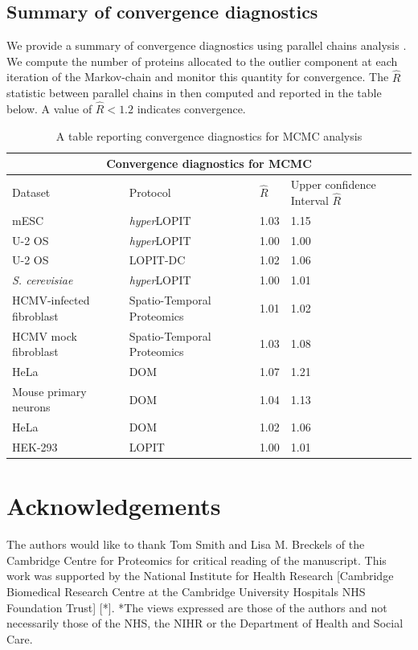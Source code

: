 \documentclass[12pt,english]{article}
\begin{document}
\subsection{Summary of convergence diagnostics}
We provide a summary of convergence diagnostics using parallel chains analysis \citep{Gelman:1992}. We compute the number of proteins allocated to the outlier component at each iteration of the Markov-chain and monitor this quantity for convergence. The $\hat{R}$ statistic between parallel chains in then computed and reported in the table below. A value of $\hat{R} < 1.2$ indicates convergence.
\begin{table}[h]
	\centering
	\footnotesize
	\begin{tabular}{ |p{5cm}|p{3cm}|p{2cm}|p{4cm}|  }
		\hline
		\multicolumn{4}{|c|}{Convergence diagnostics for MCMC} \\
		\hline
		\vfill\hfil Dataset & \vfill\hfil Protocol & \vfill\hfil$\hat{R}$ & \vfill\hfil Upper confidence Interval \vfill\hfil $\hat{R}$   \\
		\hline
		\hline
		mESC  & \textit{hyper}LOPIT&\vfill\hfil 1.03 & \vfill\hfil 1.15 \\
		\hline
		U-2 OS &\textit{hyper}LOPIT & \vfill\hfil 1.00  & \vfill\hfil 1.00\\
		\hline
		U-2 OS &LOPIT-DC  & \vfill\hfil 1.02&\vfill\hfil 1.06\\
		\hline
		\textit{S. cerevisiae} &\textit{hyper}LOPIT & \vfill\hfil 1.00 & \vfill\hfil 1.01\\
		\hline
		HCMV-infected fibroblast& Spatio-Temporal Proteomics &  \vfill\hfil 1.01 & \vfill\hfil 1.02 \\
		\hline
		HCMV mock fibroblast& Spatio-Temporal Proteomics &  \vfill\hfil 1.03 & \vfill\hfil 1.08 \\
		\hline
		HeLa \citep{Itzhak:2016}& DOM &  \vfill\hfil 1.07 & \vfill\hfil 1.21 \\
		\hline
		Mouse primary neurons & DOM &  \vfill\hfil 1.04 & \vfill\hfil 1.13 \\
		\hline
		HeLa \citep{Hirst:2018} & DOM &\vfill\hfil 1.02 & \vfill\hfil 1.06 \\
		\hline
		HEK-293 &LOPIT &  \vfill\hfil 1.00 & \vfill\hfil 1.01 \\
		\hline
		\hline
	\end{tabular}
	\caption{A table reporting convergence diagnostics for MCMC analysis}
	\label{table:mcmcconvergence}
\end{table}
 
\section{Acknowledgements}
The authors would like to thank Tom Smith and Lisa M. Breckels of the Cambridge Centre for Proteomics for critical reading of the manuscript. This work was supported by the National Institute for Health Research [Cambridge Biomedical Research Centre at the Cambridge University Hospitals NHS Foundation Trust] [*]. *The views expressed are those of the authors and not necessarily those of the NHS, the NIHR or the Department of Health and Social Care.
\end{document}
